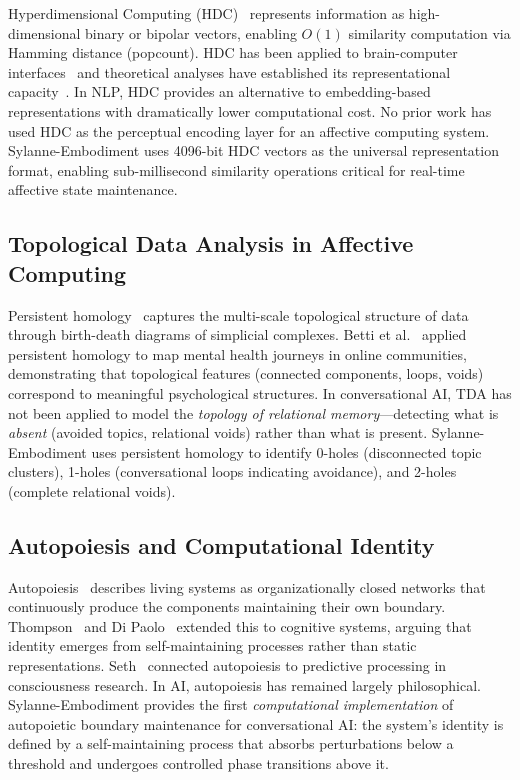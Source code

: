 \documentclass[10pt,twocolumn]{article}
\begin{document}
Hyperdimensional Computing (HDC)~\cite{kanerva2009hdc} represents information as high-dimensional binary or bipolar vectors, enabling $O(1)$ similarity computation via Hamming distance (popcount). HDC has been applied to brain-computer interfaces~\cite{rahimi2016hdc} and theoretical analyses have established its representational capacity~\cite{thomas2021hdc_nlp}. In NLP, HDC provides an alternative to embedding-based representations with dramatically lower computational cost. No prior work has used HDC as the perceptual encoding layer for an affective computing system. Sylanne-Embodiment uses 4096-bit HDC vectors as the universal representation format, enabling sub-millisecond similarity operations critical for real-time affective state maintenance.

\subsection{Topological Data Analysis in Affective Computing}

Persistent homology~\cite{ghrist2008barcodes,edelsbrunner2010tda} captures the multi-scale topological structure of data through birth-death diagrams of simplicial complexes. Betti et al.~\cite{betti2026persistent} applied persistent homology to map mental health journeys in online communities, demonstrating that topological features (connected components, loops, voids) correspond to meaningful psychological structures. In conversational AI, TDA has not been applied to model the \emph{topology of relational memory}---detecting what is \emph{absent} (avoided topics, relational voids) rather than what is present. Sylanne-Embodiment uses persistent homology to identify 0-holes (disconnected topic clusters), 1-holes (conversational loops indicating avoidance), and 2-holes (complete relational voids).

\subsection{Autopoiesis and Computational Identity}

Autopoiesis~\cite{maturana1980autopoiesis} describes living systems as organizationally closed networks that continuously produce the components maintaining their own boundary. Thompson~\cite{thompson2007life_mind} and Di Paolo~\cite{di_paolo2005autopoiesis} extended this to cognitive systems, arguing that identity emerges from self-maintaining processes rather than static representations. Seth~\cite{seth2021being} connected autopoiesis to predictive processing in consciousness research. In AI, autopoiesis has remained largely philosophical. Sylanne-Embodiment provides the first \emph{computational implementation} of autopoietic boundary maintenance for conversational AI: the system's identity is defined by a self-maintaining process that absorbs perturbations below a threshold and undergoes controlled phase transitions above it.
\end{document}
